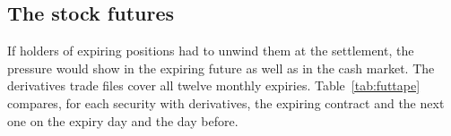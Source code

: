 \begin{table}[htbp]
\centering
\small
\caption{Net aggressor flow in the window, the window's move and the next morning's return.
Flow is the volume bought by aggressive buyers less the volume sold by aggressive sellers, in
per cent of the security's median session volume, in total and by the aggressor's category.
Regressions include security and session fixed effects and the session-type indicators and
their interactions with flow; only the flow terms and their interaction with the monthly
expiry are shown. Standard errors clustered by session in parentheses.}
\label{tab:flow}
\resizebox{\textwidth}{!}{}
\end{table}

\subsection{The stock futures}\label{sec:futures}

If holders of expiring positions had to unwind them at the settlement, the pressure would show
in the expiring future as well as in the cash market. The derivatives trade files cover all
twelve monthly expiries. Table~\ref{tab:futtape} compares, for each security with
derivatives, the expiring contract and the next one on the expiry day and the day before.


